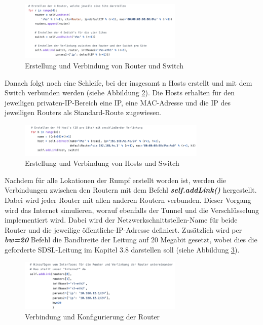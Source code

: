 \documentclass[fontsize=12pt,paper=a4,open=any,parskip=half,
  twoside=false,toc=listof,toc=bibliography,fleqn,leqno,
  captions=nooneline,captions=tableabove,british]{scrbook}
\begin{document}
\begin{figure}[H]
 \centering
 \includegraphics[width=0.7\textwidth]{Bilder/mininet2}
 \captionsetup{justification=centering,margin=1cm}
 \caption{Erstellung und Verbindung von Router und Switch}
 \label{mininet2}
\end{figure}

Danach folgt noch eine Schleife, bei der insgesamt n Hosts erstellt und mit dem Switch verbunden werden (siehe Abbildung \ref{mininet3}). Die Hosts erhalten für den jeweiligen privaten-IP-Bereich eine IP, eine MAC-Adresse und die IP des jeweiligen Routers als Standard-Route zugewiesen.
 
\begin{figure}[H]
 \centering
 \includegraphics[width=0.8\textwidth]{Bilder/mininet3}
 \captionsetup{justification=centering,margin=1cm}
 \caption{Erstellung und Verbindung von Hosts und Switch}
 \label{mininet3}
\end{figure}

Nachdem für alle Lokationen der Rumpf erstellt worden ist, werden die Verbindungen zwischen den Routern mit dem Befehl \textit{\textbf{self.addLink()}} hergestellt. Dabei wird jeder Router mit allen anderen Routern verbunden. Dieser Vorgang wird das Internet simulieren, worauf ebenfalls der Tunnel und die Verschlüsselung implementiert wird. Dabei wird der Netzwerkschnittstellen-Name für beide Router und die jeweilige öffentliche-IP-Adresse definiert. Zusätzlich wird per \textit{\textbf{bw=20}} Befehl die Bandbreite der Leitung auf 20 Megabit gesetzt, wobei dies die geforderte SDSL-Leitung im Kapitel 3.8 darstellen soll (siehe Abbildung \ref{mininet4}).

\begin{figure}[H]
 \centering
 \includegraphics[width=0.7\textwidth]{Bilder/mininet4}
 \captionsetup{justification=centering,margin=1cm}
 \caption{Verbindung und Konfigurierung der Router}
 \label{mininet4}
\end{figure}
\end{document}
